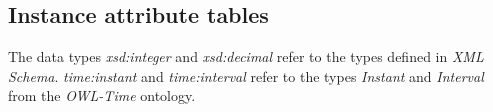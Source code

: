\subsection{Instance attribute tables}
\label{subsec:appendix_instance_attribute_tables}



The data types \emph{xsd:integer} and \emph{xsd:decimal} refer to the types defined in \emph{XML Schema}\cite{xml-schema-datatypes}. \emph{time:instant} and \emph{time:interval} refer to the types \emph{Instant} and \emph{Interval} from the \emph{OWL-Time}  ontology\cite{owl-time}.

